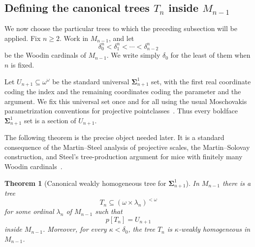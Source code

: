 \documentclass[a4paper,11pt]{article}
\newtheorem{theorem}{Theorem}[section]
\begin{document}
\subsection{Defining the canonical trees $T_n$ inside $M_{n-1}$}\label{subsec:canonical-trees-tn}

We now choose the particular trees to which the preceding subsection will be applied.  Fix $n\geq 2$.  Work in $M_{n-1}$, and let
\[
   \delta^n_0<\delta^n_1<\cdots<\delta^n_{n-2}
\]
be the Woodin cardinals of $M_{n-1}$.  We write simply $\delta_0$ for the least of them when $n$ is fixed.

Let $U_{n+1}\subseteq\omega^\omega$ be the standard universal $\boldsymbol\Sigma^1_{n+1}$ set, with the first real coordinate coding the index and the remaining coordinates coding the parameter and the argument.  We fix this universal set once and for all using the usual Moschovakis parametrization conventions for projective pointclasses~\cite{Moschovakis}.  Thus every boldface $\boldsymbol\Sigma^1_{n+1}$ set is a section of $U_{n+1}$.

The following theorem is the precise object needed later.  It is a standard consequence of the Martin--Steel analysis of projective scales, the Martin--Solovay construction, and Steel's tree-production argument for mice with finitely many Woodin cardinals~\cite{martin2008tree,Steel2,steel2009derived}.

\begin{theorem}[Canonical weakly homogeneous tree for $\boldsymbol\Sigma^1_{n+1}$]\label{thm:canonical-tn-existence}
In $M_{n-1}$ there is a tree
\[
   T_n\subseteq (\omega\times\lambda_n)^{<\omega}
\]
for some ordinal $\lambda_n$ of $M_{n-1}$ such that
\[
   p[T_n]=U_{n+1}
\]
inside $M_{n-1}$.  Moreover, for every $\kappa<\delta_0$, the tree $T_n$ is $\kappa$-weakly homogeneous in $M_{n-1}$.
\end{theorem}
\end{document}
